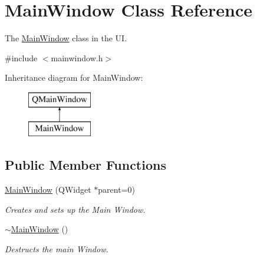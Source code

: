 \hypertarget{class_main_window}{}\section{Main\+Window Class Reference}
\label{class_main_window}


The \hyperlink{class_main_window}{Main\+Window} class in the UI.  




{\ttfamily \#include $<$mainwindow.\+h$>$}

Inheritance diagram for Main\+Window\+:\begin{figure}[H]
\begin{center}
\leavevmode
\includegraphics[height=2.000000cm]{class_main_window}
\end{center}
\end{figure}
\subsection*{Public Member Functions}
\begin{DoxyCompactItemize}
\item 
\hyperlink{class_main_window_a8b244be8b7b7db1b08de2a2acb9409db}{Main\+Window} (Q\+Widget $\ast$parent=0)
\begin{DoxyCompactList}\small\item\em Creates and sets up the Main Window. \end{DoxyCompactList}\item 
\hyperlink{class_main_window_ae98d00a93bc118200eeef9f9bba1dba7}{$\sim$\+Main\+Window} ()
\begin{DoxyCompactList}\small\item\em Destructs the main Window. \end{DoxyCompactList}\end{DoxyCompactItemize}
